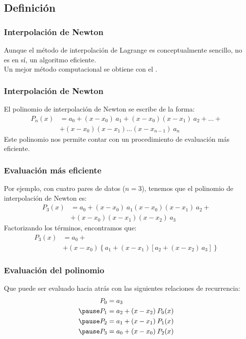 \documentclass[12pt]{beamer}
\begin{document}
\subsection{Definición}

\begin{frame}
\frametitle{Interpolación de Newton}
Aunque el método de interpolación de Lagrange es conceptualmente sencillo, no es en sí, un algoritmo eficiente.
\\
\medskip
\pause
Un mejor método computacional se obtiene con el .
\end{frame}
\begin{frame}
\frametitle{Interpolación de Newton}
El polinomio de interpolación de Newton se escribe de la forma:
\pause
\begin{align*}
P_{n} (x) &= a_{0} + (x - x_{0}) \: a_{1} + (x - x_{0})(x - x_{1}) \: a_{2} + \ldots + \\
&+ (x - x_{0})(x - x_{1}) \ldots (x - x_{n - 1}) \: a_{n} 
\end{align*}
\pause
Este polinomio nos permite contar con un procedimiento de evaluación más eficiente.
\end{frame}
\begin{frame}
\frametitle{Evaluación más eficiente}
Por ejemplo, con cuatro pares de datos ($n = 3$), tenemos que el polinomio de interpolación de Newton es:
\begin{align*}
P_{3}(x) &= a_{0} + (x - x_{0}) \: a_{1} (x - x_{0})(x - x_{1}) \: a_{2} + \\		
&+ (x - x_{0})(x - x_{1})(x - x_{2}) \: a_{3}
\end{align*}
\pause
Factorizando los términos, encontramos que:
\begin{align*}
P_{3} (x) &= a_{0} + \\
&+ (x - x_{0}) \left\{ a_{1}+(x - x_{1}) \left[ a_{2} + (x - x_{2}) \, a_{3} \right] \right\}
\end{align*}
\end{frame}
\begin{frame}
\frametitle{Evaluación del polinomio}
Que puede ser evaluado hacia atrás con las siguientes relaciones de recurrencia:
\pause
\begin{eqnarray*}
\begin{aligned}
P_{0} &= a_{3} \\ \pause
P_{1} &= a_{2} + (x - x_{2}) \: P_{0}(x) \\ \pause
P_{2} &= a_{1} + (x - x_{1}) \: P_{1}(x) \\ \pause
P_{3} &= a_{0} + (x - x_{0}) \: P_{2}(x) 
\end{aligned}
\end{eqnarray*}
\end{frame}
\end{document}

